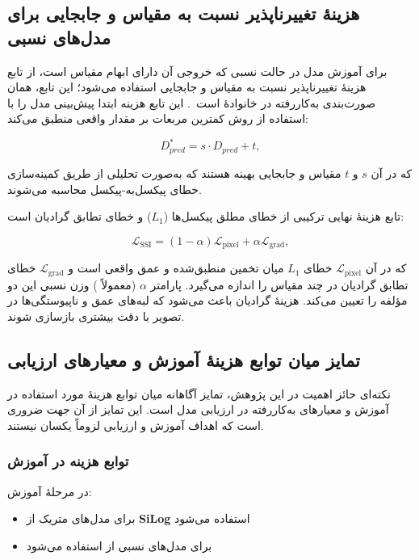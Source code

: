 \subsection{هزینهٔ تغییرناپذیر نسبت به مقیاس و جابجایی برای مدل‌های نسبی}

برای آموزش مدل در حالت نسبی  که خروجی آن دارای ابهام مقیاس است، از تابع هزینهٔ تغییرناپذیر نسبت به مقیاس و جابجایی استفاده می‌شود؛ این تابع، همان صورت‌بندی به‌کاررفته در خانوادهٔ  است~\cite{Ranftl2019Robust}. این تابع هزینه ابتدا پیش‌بینی مدل را با استفاده از روش کمترین مربعات بر مقدار واقعی منطبق می‌کند:

\begin{equation}
D^*_{pred} = s \cdot D_{pred} + t,
\end{equation}

که در آن $s$ و $t$ مقیاس و جابجایی بهینه هستند که به‌صورت تحلیلی از طریق کمینه‌سازی خطای پیکسل‌به-پیکسل محاسبه می‌شوند.

تابع هزینهٔ نهایی ترکیبی از خطای مطلق پیکسل‌ها ($L_1$) و خطای تطابق گرادیان است:

\begin{equation}
\mathcal{L}_{\text{SSI}} = (1 - \alpha) \mathcal{L}_{\text{pixel}} + \alpha \mathcal{L}_{\text{grad}},
\end{equation}

که در آن $\mathcal{L}_{\text{pixel}}$ خطای $L_1$ میان تخمین منطبق‌شده و عمق واقعی است و $\mathcal{L}_{\text{grad}}$ خطای تطابق گرادیان در چند مقیاس را اندازه می‌گیرد. پارامتر $\alpha$ (معمولاً ) وزن نسبی این دو مؤلفه را تعیین می‌کند. هزینهٔ گرادیان باعث می‌شود که لبه‌های عمق و ناپیوستگی‌ها در تصویر با دقت بیشتری بازسازی شوند.

\subsection{تمایز میان توابع هزینهٔ آموزش و معیارهای ارزیابی}

نکته‌ای حائز اهمیت در این پژوهش، تمایز آگاهانه میان توابع هزینهٔ مورد استفاده در آموزش و معیارهای به‌کاررفته در ارزیابی مدل است. این تمایز از آن جهت ضروری است که اهداف آموزش و ارزیابی لزوماً یکسان نیستند.

\subsubsection{توابع هزینه در آموزش}

در مرحلهٔ آموزش:
\begin{itemize}
    \item برای مدل‌های متریک از \textbf{SiLog} استفاده می‌شود
    \item برای مدل‌های نسبی از \textbf{} استفاده می‌شود
\end{itemize}


